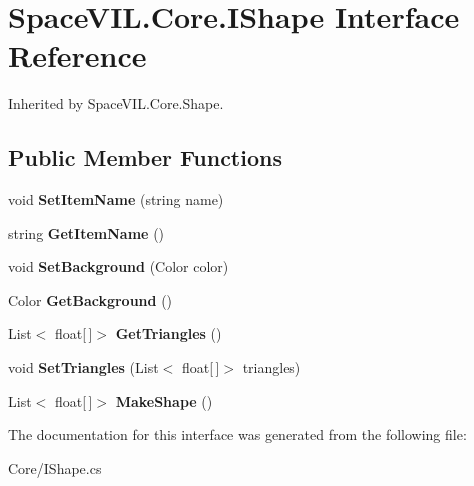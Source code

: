 \hypertarget{interface_space_v_i_l_1_1_core_1_1_i_shape}{}\section{Space\+V\+I\+L.\+Core.\+I\+Shape Interface Reference}
\label{interface_space_v_i_l_1_1_core_1_1_i_shape}


Inherited by Space\+V\+I\+L.\+Core.\+Shape.

\subsection*{Public Member Functions}
\begin{DoxyCompactItemize}
\item 
\mbox{\label{interface_space_v_i_l_1_1_core_1_1_i_shape_a39adac2309558d0f70674db24072131e}} 
void {\bfseries Set\+Item\+Name} (string name)
\item 
\mbox{\label{interface_space_v_i_l_1_1_core_1_1_i_shape_a79ba59f5a3ad62f56f8c71dd7e21bb26}} 
string {\bfseries Get\+Item\+Name} ()
\item 
\mbox{\label{interface_space_v_i_l_1_1_core_1_1_i_shape_ab46af00facb3646e33618108eea430aa}} 
void {\bfseries Set\+Background} (Color color)
\item 
\mbox{\label{interface_space_v_i_l_1_1_core_1_1_i_shape_ae1f65d2c2fdb5bd10850b39707ad42bf}} 
Color {\bfseries Get\+Background} ()
\item 
\mbox{\label{interface_space_v_i_l_1_1_core_1_1_i_shape_a67ee819242fe49ca657378622f3069aa}} 
List$<$ float\mbox{[}$\,$\mbox{]}$>$ {\bfseries Get\+Triangles} ()
\item 
\mbox{\label{interface_space_v_i_l_1_1_core_1_1_i_shape_a4ef07caef612c1ff83286095c17010d5}} 
void {\bfseries Set\+Triangles} (List$<$ float\mbox{[}$\,$\mbox{]}$>$ triangles)
\item 
\mbox{\label{interface_space_v_i_l_1_1_core_1_1_i_shape_a8924c5d1ac87a33220b39fdd8ebb8399}} 
List$<$ float\mbox{[}$\,$\mbox{]}$>$ {\bfseries Make\+Shape} ()
\end{DoxyCompactItemize}


The documentation for this interface was generated from the following file\+:\begin{DoxyCompactItemize}
\item 
Core/I\+Shape.\+cs\end{DoxyCompactItemize}

